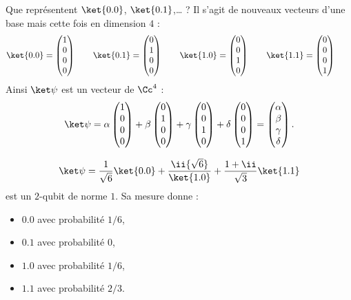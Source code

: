 \documentclass[11pt,class=report,crop=false]{standalone}
\begin{document}
Que représentent $\ket{0.0}$, $\ket{0.1}$,\ldots{} ? Il s'agit de nouveaux vecteurs d'une base mais cette fois en dimension $4$ :
$$
\ket{0.0} = \begin{pmatrix}1\\0\\0\\0\end{pmatrix} \qquad 
\ket{0.1} = \begin{pmatrix}0\\1\\0\\0\end{pmatrix} \qquad 
\ket{1.0} = \begin{pmatrix}0\\0\\1\\0\end{pmatrix} \qquad 
\ket{1.1} = \begin{pmatrix}0\\0\\0\\1\end{pmatrix} \qquad 
$$
Ainsi $\ket\psi$ est un vecteur de $\Cc^4$ :
$$\ket\psi = 
\alpha \begin{pmatrix}1\\0\\0\\0\end{pmatrix}+
\beta \begin{pmatrix}0\\1\\0\\0\end{pmatrix} +
\gamma \begin{pmatrix}0\\0\\1\\0\end{pmatrix} + 
\delta \begin{pmatrix}0\\0\\0\\1\end{pmatrix}
= \begin{pmatrix}\alpha\\\beta\\\gamma\\\delta\end{pmatrix}.$$

\begin{exemple}
$$\ket\psi =
\frac1{\sqrt6} \ket{0.0} + \frac\ii{\sqrt6}\ket{1.0} +  \frac{1+\ii}{\sqrt3}\ket{1.1}$$
est un $2$-qubit de norme $1$.
Sa mesure donne :
\begin{itemize}
  \item $0.0$ avec probabilité $1/6$,
  \item $0.1$ avec probabilité $0$,
  \item $1.0$ avec probabilité $1/6$,
  \item $1.1$ avec probabilité $2/3$.      
\end{itemize}

\end{exemple}
\end{document}
